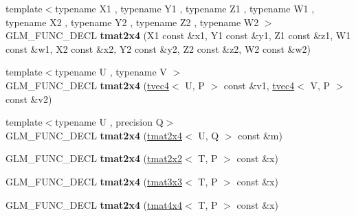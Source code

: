 \begin{DoxyCompactItemize}
\item 
\hypertarget{structglm_1_1detail_1_1tmat2x4_a062180e9aa13dc809833a430d28ac3df}{{\footnotesize template$<$typename X1 , typename Y1 , typename Z1 , typename W1 , typename X2 , typename Y2 , typename Z2 , typename W2 $>$ }\\G\-L\-M\-\_\-\-F\-U\-N\-C\-\_\-\-D\-E\-C\-L {\bfseries tmat2x4} (X1 const \&x1, Y1 const \&y1, Z1 const \&z1, W1 const \&w1, X2 const \&x2, Y2 const \&y2, Z2 const \&z2, W2 const \&w2)}\label{structglm_1_1detail_1_1tmat2x4_a062180e9aa13dc809833a430d28ac3df}

\item 
\hypertarget{structglm_1_1detail_1_1tmat2x4_a83ae4e28845c271611c3c4a41d9afb83}{{\footnotesize template$<$typename U , typename V $>$ }\\G\-L\-M\-\_\-\-F\-U\-N\-C\-\_\-\-D\-E\-C\-L {\bfseries tmat2x4} (\hyperlink{structglm_1_1detail_1_1tvec4}{tvec4}$<$ U, P $>$ const \&v1, \hyperlink{structglm_1_1detail_1_1tvec4}{tvec4}$<$ V, P $>$ const \&v2)}\label{structglm_1_1detail_1_1tmat2x4_a83ae4e28845c271611c3c4a41d9afb83}

\item 
\hypertarget{structglm_1_1detail_1_1tmat2x4_a112e455f02edb2c42ef8c0ad72495a4e}{{\footnotesize template$<$typename U , precision Q$>$ }\\G\-L\-M\-\_\-\-F\-U\-N\-C\-\_\-\-D\-E\-C\-L {\bfseries tmat2x4} (\hyperlink{structglm_1_1detail_1_1tmat2x4}{tmat2x4}$<$ U, Q $>$ const \&m)}\label{structglm_1_1detail_1_1tmat2x4_a112e455f02edb2c42ef8c0ad72495a4e}

\item 
\hypertarget{structglm_1_1detail_1_1tmat2x4_aef916b6a3c4b7957458c9b7bc5895841}{G\-L\-M\-\_\-\-F\-U\-N\-C\-\_\-\-D\-E\-C\-L {\bfseries tmat2x4} (\hyperlink{structglm_1_1detail_1_1tmat2x2}{tmat2x2}$<$ T, P $>$ const \&x)}\label{structglm_1_1detail_1_1tmat2x4_aef916b6a3c4b7957458c9b7bc5895841}

\item 
\hypertarget{structglm_1_1detail_1_1tmat2x4_a5b2e53893c5960805f0315217f4fc5e9}{G\-L\-M\-\_\-\-F\-U\-N\-C\-\_\-\-D\-E\-C\-L {\bfseries tmat2x4} (\hyperlink{structglm_1_1detail_1_1tmat3x3}{tmat3x3}$<$ T, P $>$ const \&x)}\label{structglm_1_1detail_1_1tmat2x4_a5b2e53893c5960805f0315217f4fc5e9}

\item 
\hypertarget{structglm_1_1detail_1_1tmat2x4_aab92f80bbe5811c595f4c55ed1c7d186}{G\-L\-M\-\_\-\-F\-U\-N\-C\-\_\-\-D\-E\-C\-L {\bfseries tmat2x4} (\hyperlink{structglm_1_1detail_1_1tmat4x4}{tmat4x4}$<$ T, P $>$ const \&x)}\label{structglm_1_1detail_1_1tmat2x4_aab92f80bbe5811c595f4c55ed1c7d186}


\end{DoxyCompactItemize}
